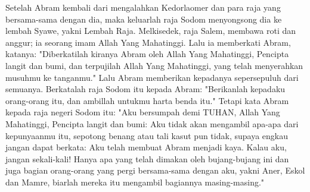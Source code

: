 \begin{biblechapter}
 Setelah Abram kembali dari mengalahkan Kedorlaomer dan para raja yang bersama-sama dengan dia, maka keluarlah raja Sodom menyongsong dia ke lembah Syawe, yakni Lembah Raja.
\verse Melkisedek, raja Salem, membawa roti dan anggur; ia seorang imam Allah Yang Mahatinggi.
\verse Lalu ia memberkati Abram, katanya: "Diberkatilah kiranya Abram oleh Allah Yang Mahatinggi, Pencipta langit dan bumi,
\verse dan terpujilah Allah Yang Mahatinggi, yang telah menyerahkan musuhmu ke tanganmu." Lalu Abram memberikan kepadanya sepersepuluh dari semuanya.
\verse Berkatalah raja Sodom itu kepada Abram: "Berikanlah kepadaku orang-orang itu, dan ambillah untukmu harta benda itu."
\verse Tetapi kata Abram kepada raja negeri Sodom itu: "Aku bersumpah demi TUHAN, Allah Yang Mahatinggi, Pencipta langit dan bumi:
\verse Aku tidak akan mengambil apa-apa dari kepunyaanmu itu, sepotong benang atau tali kasut pun tidak, supaya engkau jangan dapat berkata: Aku telah membuat Abram menjadi kaya.
\verse Kalau aku, jangan sekali-kali! Hanya apa yang telah dimakan oleh bujang-bujang ini dan juga bagian orang-orang yang pergi bersama-sama dengan aku, yakni Aner, Eskol dan Mamre, biarlah mereka itu mengambil bagiannya masing-masing."
\end{biblechapter}


